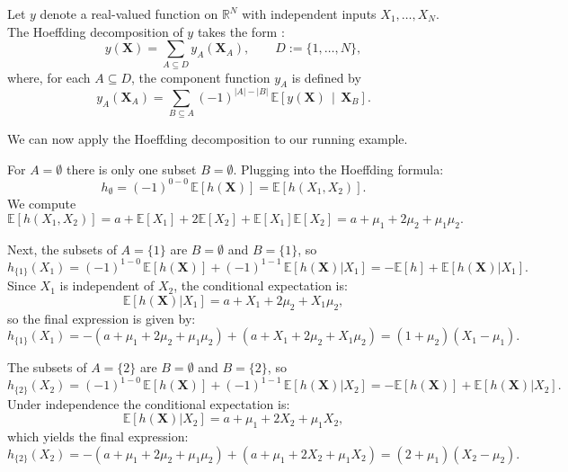 \begin{definition}
Let $y$ denote a real-valued function on $\mathbb{R}^N$ with independent inputs $X_1, \dots, X_N$. The Hoeffding decomposition of $y$ takes the form \citep{ilidrissi2025}:
\[
y(\boldsymbol{X})
=
\sum_{A \subseteq D} 
y_A(\boldsymbol{X}_A),
\qquad
D := \{1,\dots,N\},
\]
where, for each $A \subseteq D$, the component function $y_A$ is defined by
\[
y_A(\boldsymbol{X}_A)
=
\sum_{B \subseteq A}
(-1)^{|A|-|B|}
\,\mathbb{E}\!\left[
  y(\boldsymbol{X}) 
  \,\middle|\, 
  \boldsymbol{X}_B
\right].
\]
\end{definition}

We can now apply the Hoeffding decomposition to our running example.\par

For $A=\emptyset$ there is only one subset $B=\emptyset$. 
Plugging into the Hoeffding formula:
\[
h_{\emptyset}
=
(-1)^{0-0}\,
\mathbb{E}[h(\boldsymbol{X})]
=
\mathbb{E}[h(X_1,X_2)].
\]
We compute
\[
\mathbb{E}[h(X_1,X_2)]
= a + \mathbb{E}[X_1] + 2 \mathbb{E}[X_2] 
  + \mathbb{E}[X_1]\mathbb{E}[X_2]
= a + \mu_1 + 2\mu_2 + \mu_1\mu_2.
\]

Next, the subsets of $A=\{1\}$ are $B=\emptyset$ and $B=\{1\}$, so
\[
h_{\{1\}}(X_1)
=
(-1)^{1-0}\,\mathbb{E}[h(\boldsymbol{X})]
+
(-1)^{1-1}\,\mathbb{E}[h(\boldsymbol{X})|X_1]
=
-\mathbb{E}[h] + \mathbb{E}[h(\boldsymbol{X})|X_1].
\]
Since $X_1$ is independent of $X_2$, the conditional expectation is:
\[
\mathbb{E}[h(\boldsymbol{X})|X_1]
= a + X_1 + 2\mu_2 + X_1 \mu_2,
\]
so the final expression is given by:
\[
h_{\{1\}}(X_1)
= - (a+\mu_1+2\mu_2+\mu_1\mu_2) + (a+X_1+2\mu_2+X_1\mu_2)
= (1+\mu_2)(X_1 - \mu_1).
\]

The subsets of $A=\{2\}$ are $B=\emptyset$ and $B=\{2\}$, so
\[
h_{\{2\}}(X_2)
=
(-1)^{1-0}\,\mathbb{E}[h(\boldsymbol{X})]
+
(-1)^{1-1}\,\mathbb{E}[h(\boldsymbol{X})|X_2]
=
-\mathbb{E}[h(\boldsymbol{X})] + \mathbb{E}[h(\boldsymbol{X})|X_2].
\]
Under independence the conditional expectation is:
\[
\mathbb{E}[h(\boldsymbol{X})|X_2]
= a + \mu_1 + 2X_2 + \mu_1 X_2,
\]
which yields the final expression:
\[
h_{\{2\}}(X_2)
= - (a+\mu_1+2\mu_2+\mu_1\mu_2) + (a+\mu_1+2X_2+\mu_1 X_2)
= (2+\mu_1)(X_2 - \mu_2).
\]

